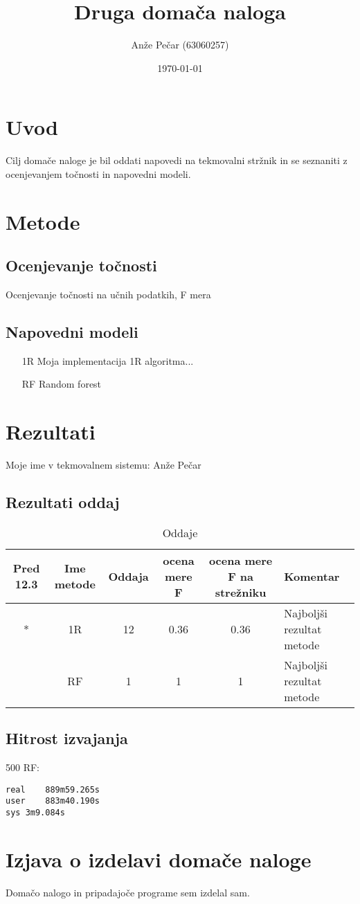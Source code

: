 \documentclass[a4paper,11pt]{article}
\title{Druga domača naloga}
\author{Anže Pečar (63060257)}
\date{\today}
\begin{document}
\maketitle

\section{Uvod}

Cilj domače naloge je bil oddati napovedi na tekmovalni stržnik in se seznaniti z ocenjevanjem točnosti in napovedni modeli.

\section{Metode}
\subsection{Ocenjevanje točnosti}
Ocenjevanje točnosti na učnih podatkih, F mera
\subsection{Napovedni modeli}
\begin{itemize}
\item[1R] Moja implementacija 1R algoritma...
\item[RF] Random forest
\end{itemize}
\section{Rezultati}
Moje ime v tekmovalnem sistemu: Anže Pečar
\subsection{Rezultati oddaj}
\begin{table}[H]
\caption{Oddaje}
\begin{tabular}{ c c c c c l }
 Pred 12.3 & Ime metode & Oddaja & ocena mere F & ocena mere F na strežniku & Komentar\\
  \hline
  * & 1R & 12 & 0.36 & 0.36 & Najboljši rezultat metode \\
  \* & RF & 1 & 1 & 1 & Najboljši rezultat metode \\
 \end{tabular}
\end{table}

\subsection{Hitrost izvajanja}
500 RF:
\begin{verbatim}
real	889m59.265s
user	883m40.190s
sys	3m9.084s
\end{verbatim}

\section{Izjava o izdelavi domače naloge}
Domačo nalogo in pripadajoče programe sem izdelal sam.
\end{document}
